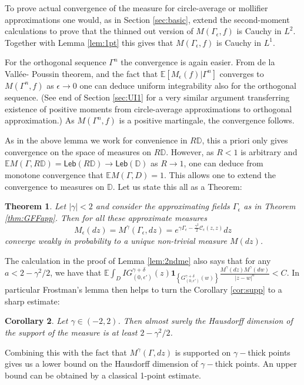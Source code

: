 \documentclass[11pt]{amsart}
\newtheorem{thm}{Theorem}[section]
\newtheorem{cor}[thm]{Corollary}
\newcommand{\C}{\mathcal C}
\newcommand{\D}{\mathbb D}
\newcommand{\E}{\mathbb E}
\newcommand{\I}[1]{\mathbf{1}_{\left \{#1\right \}}}
\renewcommand{\1}{\mathbf 1}
\newcommand{\Leb}{\mathsf{Leb}}
\newcommand{\eps}{\epsilon}
\begin{document}
To prove actual convergence of the measure for circle-average or mollifier approximations one would, as in Section \ref{sec:basic}, extend the second-moment calculations to prove that the thinned out version of $M(\Gamma_\eps,f)$ is Cauchy in $L^2$. Together with Lemma \ref{lem:1pt} this gives that $M(\Gamma_\eps,f)$ is Cauchy in $L^1$. 

For the orthogonal sequence $\Gamma^n$ the convergence is again easier. From de la Vall\'ee- Poussin theorem, and the fact that $\E \left[M_{\eps}(f) | \Gamma^n\right]$ converges to $M(\Gamma^n, f)$ as $\eps \to 0$ one can deduce uniform integrability also for the orthogonal sequence. (See end of Section \ref{sec:UI1} for a very similar argument transferring existence of positive moments from circle-average approximations to orthogonal approximation.) As $M(\Gamma^n,f)$ is a positive martingale, the convergence follows. 

As in the above lemma we work for convenience in $R\D$, this a priori only gives convergence on the space of measures on $R\D$. However, as $R < 1$ is arbitrary and $\E M(\Gamma,R\D) = \Leb(R\D) \to \Leb(\D)$ as $R \to 1$, one can deduce from monotone convergence that $\E M(\Gamma,D) = 1$. This allows one to extend the convergence to measures on $\D$. Let us state this all as a Theorem:

\begin{thm}\label{thm:basic}
Let $|\gamma| < 2$ and consider the approximating fields $\Gamma_\eps$ as in Theorem \ref{thm:GFFapp}. Then for all these approximate measures $$M_\eps(dz) = M^\gamma(\Gamma_\eps, dz) = e^{\gamma \Gamma_\eps - \frac{\gamma^2}{2}\C_\eps(z,z)}dz$$
converge weakly in probability to a unique non-trivial measure $M(dz)$.
\end{thm}

The calculation in the proof of Lemma \ref{lem:2ndme} also says that for any $a < 2-\gamma^2/2$, we have that $\E \int_D I{G^{\gamma+\delta}_{(0, \eps')}(z)}\I{G^{\gamma+\delta}_{(0, \eps')}(w)}\frac{M^\gamma(dz)M^\gamma(dw)}{|z-w|^a} < C$. In particular Frostman's lemma then helps to turn the Corollary \ref{cor:supp} to a sharp estimate:
\begin{cor}\label{cor:dimsharp}
Let $\gamma \in (-2, 2)$. Then  almost surely the Hausdorff dimension of the support of the measure is at least $2-\gamma^2/2$.
\end{cor}

Combining this with the fact that $M^\gamma(\Gamma,dz)$ is supported on $\gamma-$thick points gives us a lower bound on the Hausdorff dimension of $\gamma-$thick points. An upper bound can be obtained by a classical 1-point estimate.
\end{document}
